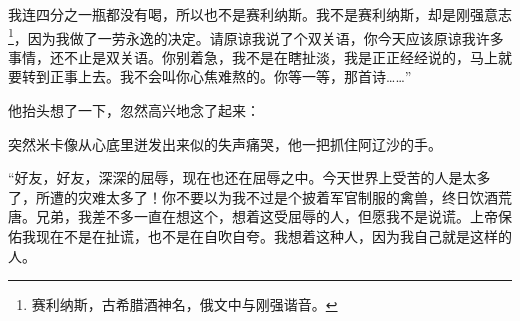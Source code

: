 \par 我连四分之一瓶都没有喝，所以也不是赛利纳斯。我不是赛利纳斯，却是刚强意志\footnote{赛利纳斯，古希腊酒神名，俄文中与刚强谐音。}，因为我做了一劳永逸的决定。请原谅我说了个双关语，你今天应该原谅我许多事情，还不止是双关语。你别着急，我不是在瞎扯淡，我是正正经经说的，马上就要转到正事上去。我不会叫你心焦难熬的。你等一等，那首诗……”
\par 他抬头想了一下，忽然高兴地念了起来：
\par 突然米卡像从心底里迸发出来似的失声痛哭，他一把抓住阿辽沙的手。
\par “好友，好友，深深的屈辱，现在也还在屈辱之中。今天世界上受苦的人是太多了，所遭的灾难太多了！你不要以为我不过是个披着军官制服的禽兽，终日饮酒荒唐。兄弟，我差不多一直在想这个，想着这受屈辱的人，但愿我不是说谎。上帝保佑我现在不是在扯谎，也不是在自吹自夸。我想着这种人，因为我自己就是这样的人。
